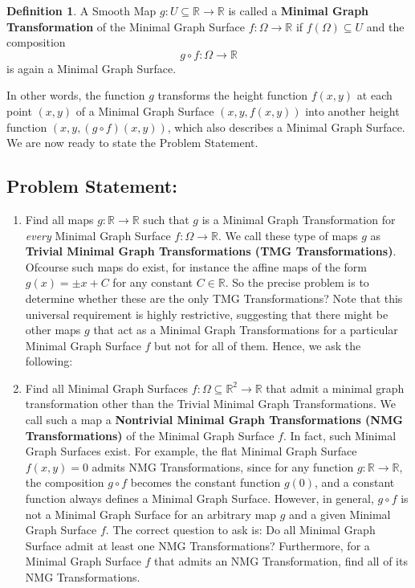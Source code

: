 \documentclass[12pt]{article}
\theoremstyle{plain}
\theoremstyle{definition}
\newtheorem{definition}[theorem]{Definition}
\theoremstyle{remark}
\begin{document}
	 \begin{definition}
	 	A Smooth Map \(g: U \subseteq \mathbb{R} \longrightarrow \mathbb{R}\) is called a \textbf{Minimal Graph Transformation} of the Minimal Graph Surface \(f: \Omega \longrightarrow \mathbb{R} \) if \(f(\Omega)\subseteq U\) and the composition
	 	\[
	 	g \circ f:\Omega\longrightarrow \mathbb{R}
	 	\]
	 	is again a Minimal Graph Surface.
	 \end{definition}
	 
	 In other words, the function $g$ transforms the height function $f(x,y)$ at each point $(x,y)$ of a Minimal Graph Surface $(x,y,f(x,y))$ into another height function $(x,y, (g \circ f)(x,y))$, which also describes a Minimal Graph Surface. We  are now ready to state the Problem Statement.
	 \subsection{Problem Statement:}
	 \begin{enumerate}
	 	\item Find all maps $g:\mathbb{R}\longrightarrow\mathbb{R}$ such that $g$ is a Minimal Graph Transformation for \emph{every} Minimal Graph Surface $f: \Omega \longrightarrow \mathbb{R}$. We call these type of maps \(g\) as \textbf{Trivial Minimal Graph Transformations (TMG Transformations)}. Ofcourse such maps do exist, for instance the affine maps of the form $g(x) = \pm x + C$ for any constant $C \in \mathbb{R}$. So the precise problem is to determine whether these are the only TMG Transformations?  Note that this universal requirement is highly restrictive, suggesting that there might be other maps $g$ that act as a Minimal Graph Transformations for a particular Minimal Graph Surface $f$ but not for all of them. Hence, we ask the following:
	 	
	 	\item Find all Minimal Graph Surfaces \(f: \Omega \subseteq \mathbb{R}^2 \longrightarrow \mathbb{R}\) that admit a minimal graph transformation other than the Trivial Minimal Graph Transformations. We call such a map a \textbf{Nontrivial Minimal Graph Transformations (NMG Transformations)} of the Minimal Graph Surface \(f\). In fact, such Minimal Graph Surfaces exist. For example, the flat Minimal Graph Surface \(f(x,y)=0\) admits NMG Transformations, since for any function \(g:\mathbb{R}\longrightarrow\mathbb{R}\), the composition \(g \circ f\) becomes the constant function \(g(0)\), and a constant function always defines a Minimal Graph Surface. However, in general, \(g \circ f\) is not a Minimal Graph Surface for an arbitrary map \(g\) and a given Minimal Graph Surface \(f\). The correct question to ask is: Do all Minimal Graph Surface admit at least one NMG Transformations? Furthermore, for a  Minimal Graph Surface \(f\) that admits an NMG Transformation, find all of its NMG Transformations.
	 \end{enumerate}
	 
\end{document}

